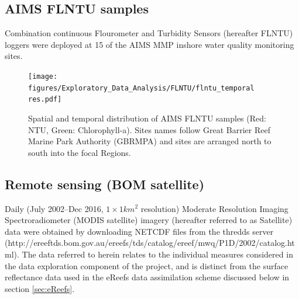 

\clearpage

\subsection{AIMS FLNTU samples}
  
Combination continuous Flourometer and Turbidity Sensors (hereafter FLNTU) loggers were deployed at
15 of the AIMS MMP inshore water quality monitoring sites.
 
 

\begin{figure}[ptbh] \texttt{[image: figures/Exploratory\_Data\_Analysis/FLNTU/flntu\_temporal\\res.pdf]}
\caption{Spatial and temporal distribution of AIMS FLNTU samples (Red: NTU, Green: Chlorophyll-a).
Sites names follow Great Barrier Reef Marine Park Authority (GBRMPA) and sites are arranged north to
south into the focal Regions.}\label{fig:flntu_temporal}
\end{figure}

\clearpage

\subsection{Remote sensing (BOM satellite)}

Daily (July 2002--Dec 2016, $1\times 1 km^2$ resolution) Moderate Resolution Imaging
Spectroradiometer (MODIS satellite) imagery (hereafter referred to as Satellite) data were obtained
by downloading NETCDF files from the thredds server (http://ereeftds.bom.gov.au/ereefs/tds/catalog/ereef/mwq/P1D/2002/catalog.html).
The data referred to herein relates to the individual measures considered in the data exploration
component of the project, and is distinct from the surface reflectance data used in the eReefs data
assimilation scheme discussed below in section \ref{sec:eReefs}.



 





